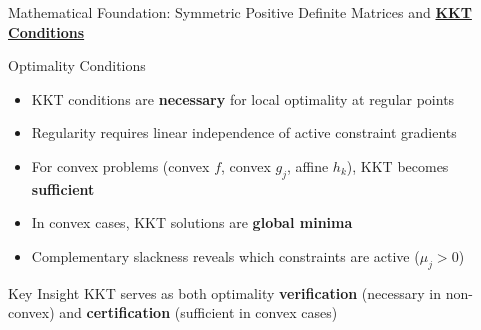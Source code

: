 \documentclass{beamer}
\begin{document}
\begin{frame}{{Mathematical Foundation: Symmetric Positive Definite Matrices and \textbf{\underline{KKT Conditions}}}}
\begin{block}{Optimality Conditions}

\begin{itemize}
\item  KKT conditions are \textbf{necessary} for local optimality at regular points
\item  Regularity requires linear independence of active constraint gradients
\item  For convex problems (convex $f$, convex $g_j$, affine $h_k$), KKT becomes \textbf{sufficient}
\item  In convex cases, KKT solutions are \textbf{global minima}
\item  Complementary slackness reveals which constraints are active ($\mu_j > 0$)
\end{itemize}

\end{block}

\begin{alertblock}{Key Insight}
KKT serves as both optimality \textbf{verification} (necessary in non-convex) and \textbf{certification} (sufficient in convex cases)
\end{alertblock}
\end{frame}


\end{document}
